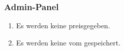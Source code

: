 \subsubsection{Admin-Panel}

\begin{enumerate}
    \item Es werden keine %
        preisgegeben.
    \item Es werden keine %
        vom %
        gespeichert.
\end{enumerate}